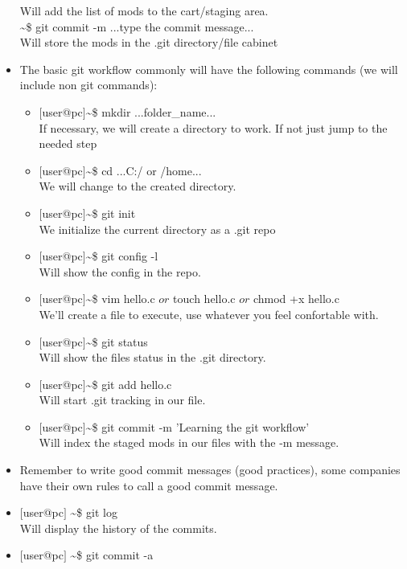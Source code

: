 \documentclass[12pt,a4paper]{article} %
\begin{document}
\begin{itemize}
Will add the list of mods to the cart/staging area.\\
\tabto{1.1cm}\textasciitilde\$ git commit -m ...type the commit message...\\
Will store the mods in the .git directory/file cabinet
\item The basic git workflow commonly will have the following commands (we will include non git commands):\\
\begin{itemize}
\item$[$user@pc$]$\textasciitilde\$ mkdir ...folder\_name...\\
If necessary, we will create a directory to work. If not just jump to the needed step
\item$[$user@pc$]$\textasciitilde\$ cd ...C:/ or /home...\\
We will change to the created directory.
\item$[$user@pc$]$\textasciitilde\$ git init\\
We initialize the current directory as a .git repo
\item$[$user@pc$]$\textasciitilde\$ git config -l\\
Will show the config in the repo.
\item$[$user@pc$]$\textasciitilde\$ vim hello.c $or$ touch hello.c $or$ chmod +x hello.c\\
We'll create a file to execute, use whatever you feel confortable with.
\item$[$user@pc$]$\textasciitilde\$ git status\\
Will show the files status in the .git directory.
\item$[$user@pc$]$\textasciitilde\$ git add hello.c\\
Will start .git tracking in our file.
\item$[$user@pc$]$\textasciitilde\$ git commit -m 'Learning the git workflow'\\
Will index the staged mods in our files with the -m message.
\end{itemize}
\item Remember to write good commit messages (good practices), some companies have their own rules to call a good commit message.
\item $[$user@pc$]$ \textasciitilde\$ git log\\
Will display the history of the commits.
\item $[$user@pc$]$ \textasciitilde\$ git commit -a\\

\end{itemize}
\end{document}
